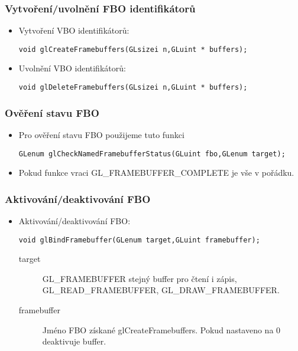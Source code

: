 \begin{frame}[fragile]
\frametitle{Vytvoření/uvolnění FBO identifikátorů}
  \begin{itemize}
    \item{
    Vytvoření VBO identifikátorů:
{\scriptsize
\begin{verbatim}
void glCreateFramebuffers(GLsizei n,GLuint * buffers);
\end{verbatim}
}}
    \item{
    Uvolnění VBO identifikátorů:
{\scriptsize
\begin{verbatim}
void glDeleteFramebuffers(GLsizei n,GLuint * buffers);
\end{verbatim}
}}
  \end{itemize}
\end{frame}

\begin{frame}[fragile]
\frametitle{Ověření stavu FBO}
  \begin{itemize}
    \item{
    Pro ověření stavu FBO použijeme tuto funkci
{\scriptsize
\begin{verbatim}
GLenum glCheckNamedFramebufferStatus(GLuint fbo,GLenum target);
\end{verbatim}
}}
    \item{
    Pokud funkce vraci {\color{red} GL\_FRAMEBUFFER\_COMPLETE} je vše v pořádku.
    }
  \end{itemize}
\end{frame}


\begin{frame}[fragile]
\frametitle{Aktivování/deaktivování FBO}
  \begin{itemize}
    \item{
    Aktivování/deaktivování FBO:
{\scriptsize
\begin{verbatim}
void glBindFramebuffer(GLenum target,GLuint framebuffer);
\end{verbatim}
}
    \begin{description}
    \item[target] GL\_FRAMEBUFFER stejný buffer pro čtení i zápis, GL\_READ\_FRAMEBUFFER, GL\_DRAW\_FRAMEBUFFER.
    \item[framebuffer] Jméno FBO získané {\color{blue} glCreateFramebuffers}.
    Pokud nastaveno na 0 deaktivuje buffer.
    \end{description}
    }
  \end{itemize}
\end{frame}

